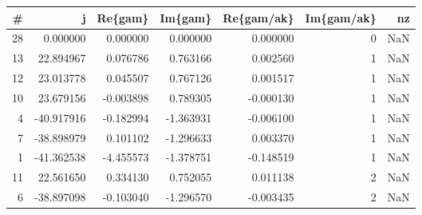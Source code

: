 \begin{tabular}{rrrrrrr}
\toprule
 \# &          j &   Re\{gam\} &   Im\{gam\} &  Re\{gam/ak\} &  Im\{gam/ak\} &  nz \\
\midrule
28 &   0.000000 &  0.000000 &  0.000000 &    0.000000 &           0 & NaN \\
13 &  22.894967 &  0.076786 &  0.763166 &    0.002560 &           1 & NaN \\
12 &  23.013778 &  0.045507 &  0.767126 &    0.001517 &           1 & NaN \\
10 &  23.679156 & -0.003898 &  0.789305 &   -0.000130 &           1 & NaN \\
 4 & -40.917916 & -0.182994 & -1.363931 &   -0.006100 &           1 & NaN \\
 7 & -38.898979 &  0.101102 & -1.296633 &    0.003370 &           1 & NaN \\
 1 & -41.362538 & -4.455573 & -1.378751 &   -0.148519 &           1 & NaN \\
11 &  22.561650 &  0.334130 &  0.752055 &    0.011138 &           2 & NaN \\
 6 & -38.897098 & -0.103040 & -1.296570 &   -0.003435 &           2 & NaN \\
\bottomrule
\end{tabular}
